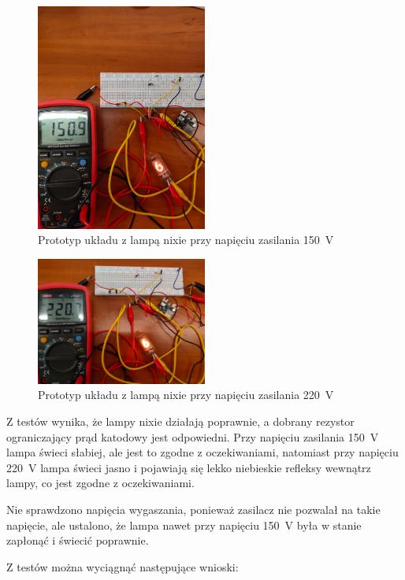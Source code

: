 \documentclass[../main.tex]{subfiles}
\begin{document}
\begin{figure}[H]
    \centering
    \includegraphics[width=0.5\textwidth]{nixie150V.jpeg}
    \caption{Prototyp układu z lampą nixie przy napięciu zasilania \SI{150}{\volt}}
\end{figure}

\begin{figure}[H]
    \centering
    \includegraphics[width=0.5\textwidth]{nixie220V.jpeg}
    \caption{Prototyp układu z lampą nixie przy napięciu zasilania \SI{220}{\volt}}
\end{figure}

Z testów wynika, że lampy nixie działają poprawnie, a dobrany rezystor ograniczający prąd katodowy jest odpowiedni. 
Przy napięciu zasilania \SI{150}{\volt} lampa świeci słabiej, ale jest to zgodne z oczekiwaniami,
natomiast przy napięciu \SI{220}{\volt} lampa świeci jasno i pojawiają się lekko niebieskie refleksy wewnątrz lampy, co jest zgodne z oczekiwaniami.

Nie sprawdzono napięcia wygaszania, ponieważ zasilacz nie pozwalał na takie napięcie, 
ale ustalono, że lampa nawet przy napięciu \SI{150}{\volt} była w stanie zapłonąć i świecić poprawnie.

Z testów można wyciągnąć następujące wnioski:
\end{document}
